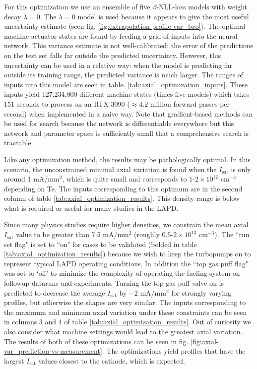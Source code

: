 For this optimization we use an ensemble of five $\beta$-NLL-loss models with weight decay $\lambda=0$. The $\lambda=0$ model is used because it appears to give the most useful uncertainty estimate (seen fig. \ref{fig:extrapolation-profile-var_two}). The optimal machine actuator states are found by feeding a grid of inputs into the neural network. This variance estimate is not well-calibrated: the error of the predictions on the test set falls far outside the predicted uncertainty. However, this uncertainty can be used in a relative way: when the model is predicting far outside its training range, the predicted variance is much larger. The ranges of inputs into this model are seen in table. \ref{tab:axial_optimization_inputs}. These inputs yield 127,234,800 different machine states (times five models) which takes 151 seconds to process on an RTX 3090 ($\approx 4.2$ million forward passes per second) when implemented in a naive way. Note that gradient-based methods can be used for search because the network is differentiable everywhere but this network and parameter space is sufficiently small that a comprehensive search is tractable.

Like any optimization method, the results may be pathologically optimal. In this scenario, the unconstrained minimal axial variation is found when the $I_\text{sat}$ is only around 1 mA/mm$^2$, which is quite small and corresponds to $1\text{-}2\times 10^{12}$ cm$^{-3}$ depending on Te. The inputs corresponding to this optimum are in the second column of table \ref{tab:axial_optimization_results}. This density range is below what is required or useful for many studies in the LAPD. 

Since many physics studies require higher densities, we constrain the mean axial $I_\text{sat}$ value to be greater than 7.5 mA/mm$^{2}$ (roughly $0.5\text{-}2 \times 10^{13} \text{ cm}^{-3}$). The ``run set flag" is set to ``on" for cases to be validated (bolded in table \ref{tab:axial_optimization_results}) because we wish to keep the turbopumps on to represent typical LAPD operating conditions. In addition the ``top gas puff flag" was set to `off' to minimize the complexity of operating the fueling system on followup dataruns and experiments. Turning the top gas puff valve on is predicted to decrease the average $I_\text{sat}$ by $-2$ mA/mm$^2$ for strongly varying profiles, but otherwise the shapes are very similar.
The inputs corresponding to the maximum and minimum axial variation under these constraints can be seen in columns 3 and 4 of table \ref{tab:axial_optimization_results}. Out of curiosity we also consider what machine settings would lead to the greatest axial variation. The results of both of these optimizations can be seen in fig. \ref{fig:axial-var_prediction-vs-measurement}. The optimizations yield profiles that have the largest $I_\text{sat}$ values closest to the cathode, which is expected.

